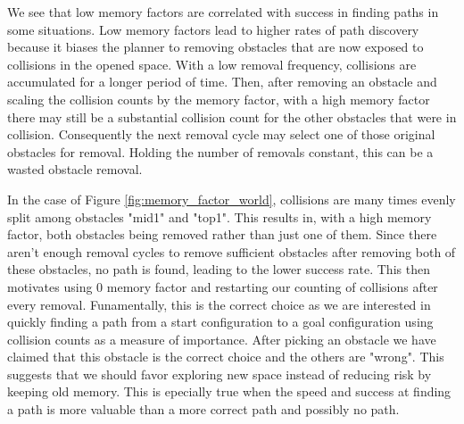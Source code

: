 We see that low memory factors are correlated with success in finding paths in some situations. Low memory factors lead to higher rates of path discovery because it biases the planner to removing obstacles that are now exposed to collisions in the opened space. With a low removal frequency, collisions are accumulated for a longer period of time. Then, after removing an obstacle and scaling the collision counts by the memory factor, with a high memory factor there may still be a substantial collision count for the other obstacles that were in collision. Consequently the next removal cycle may select one of those original obstacles for removal. Holding the number of removals constant, this can be a wasted obstacle removal. 

In the case of Figure \ref{fig:memory_factor_world}, collisions are many times evenly split among obstacles "mid1" and "top1". This results in, with a high memory factor, both obstacles being removed rather than just one of them. Since there aren't enough removal cycles to remove sufficient obstacles after removing both of these obstacles, no path is found, leading to the lower success rate. This then motivates using 0 memory factor and restarting our counting of collisions after every removal. Funamentally, this is the correct choice as we are interested in quickly finding a path from a start configuration to a goal configuration using collision counts as a measure of importance. After picking an obstacle we have claimed that this obstacle is the correct choice and the others are "wrong". This suggests that we should favor exploring new space instead of reducing risk by keeping old memory. This is epecially true when the speed and success at finding a path is more valuable than a more correct path and possibly no path.


